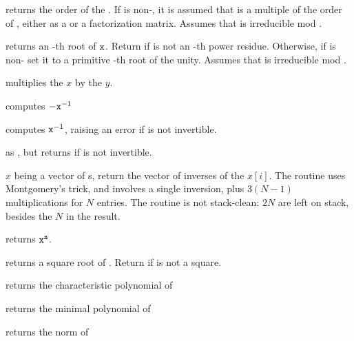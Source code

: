  returns the order of the
 . If  is non-, it is assumed that 
is a multiple of the order of , either as a  or a
factorization matrix. Assumes that  is irreducible mod .

 returns an
-th root of ${\tt x}$.  Return  if  is not an
-th power residue. Otherwise, if  is non- set it to a
primitive -th root of the unity. Assumes that  is irreducible mod .




 multiplies the  $x$
by the  $y$.



 computes $-{\tt x}^{-1}$

 computes ${\tt x}^{-1}$, raising an
error if  is not invertible.

 as , but returns
 if  is not invertible.

 $x$ being a vector of s,
return the vector of inverses of the $x[i]$. The routine uses Montgomery's
trick, and involves a single inversion, plus $3(N-1)$ multiplications for
$N$ entries. The routine is not stack-clean: $2N$  are left on
stack, besides the $N$ in the result.

 returns ${\tt x}^{\tt n}$.

 returns a square root of .
Return  if  is not a square.

 returns the characteristic
polynomial of 

 returns the minimal polynomial
of 

 returns the norm of 

